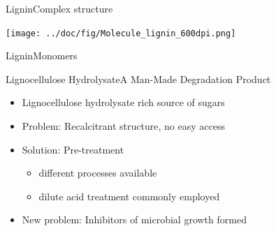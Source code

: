 \documentclass[mathserif]{beamer}
\newcommand{\LCH}{Lignocellulose Hydrolysate}
\newcommand{\LCh}{Lignocellulose hydrolysate}
\begin{document}
\begin{frame}{Lignin}{Complex structure}
	\begin{center}
		\texttt{[image: ../doc/fig/Molecule\_lignin\_600dpi.png]}
	\end{center}
\end{frame}

\begin{frame}{Lignin}{Monomers}
	\begin{figure}
		\begin{center}
			\hspace{0.05\textwidth}
			\hspace{0.05\textwidth}

			\hspace{0.05\textwidth}
			\hspace{0.05\textwidth}
		\end{center}
	\end{figure}
\end{frame}

\begin{frame}{\LCH{}}{A Man-Made Degradation Product}
	\begin{itemize}
		\item \LCh{} rich source of sugars
		\pause
		\item Problem: Recalcitrant structure, no easy access
		\pause
		\item Solution: Pre-treatment
		\pause
		\begin{itemize}
			\item different processes available
			\item dilute acid treatment commonly employed
		\end{itemize}
		\pause
		\item New problem: Inhibitors of microbial growth formed
	\end{itemize}
\end{frame}
\end{document}
